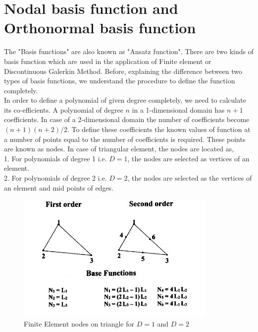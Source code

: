 \documentclass[a4paper,12pt]{book}
\begin{document}
\section{Nodal basis function and Orthonormal basis function}

The "Basis functions" are also known as "Ansatz function". There are two kinds of basis function which are used in the application of Finite element or Discontinuous Galerkin Method. 
Before, explaining the difference between two types of basis functions, we understand the procedure to define the function completely. \\

In order to define a polynomial of given degree completely, we need to calculate its co-efficients. A polynomial of degree $n$ in a 1-dimensional domain has $n+1$ coefficients. In case of a 2-dimensional domain the number of coefficients become $(n+1)(n+2)/2$. To define these coefficients the known values of function at a number of points equal to the number of coefficients is required. These points are known as nodes. In case of triangular element, the nodes are located as,\\

1. For polynomials of degree 1 i.e. $D=1$, the nodes are selected as vertices of an element.\\
2. For polynomials of degree 2 i.e. $D=2$, the nodes are selected as the vertices of an element and mid points of edges.\\

\begin{figure}
  \includegraphics[width=\linewidth]{fem_triangle.jpg}
  \caption{Finite Element nodes on triangle for $D=1$ and $D=2$ \cite{plasma}}
  \label{fig:Nodes on Triangular Element}
\end{figure}
\end{document}
